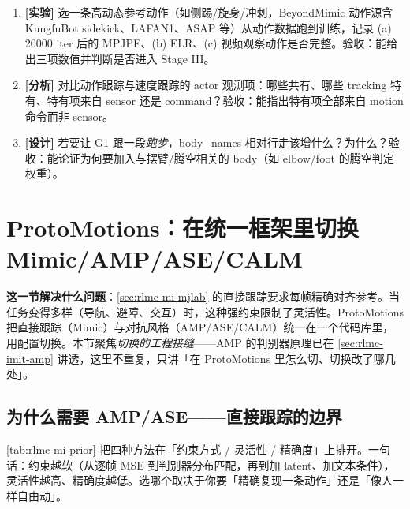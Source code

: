 \begin{practice}[本节练习]
\begin{enumerate}
  \item \textbf{[实验]} 选一条高动态参考动作（如侧踢/旋身/冲刺，BeyondMimic 动作源含 KungfuBot sidekick、LAFAN1、ASAP 等）从动作数据跑到训练，记录 (a) 20000 iter 后的 MPJPE、(b) ELR、(c) 视频观察动作是否完整。验收：能给出三项数值并判断是否进入 Stage III。
  \item \textbf{[分析]} 对比动作跟踪与速度跟踪的 actor 观测项：哪些共有、哪些 tracking 特有、特有项来自 sensor 还是 command？验收：能指出特有项全部来自 motion 命令而非 sensor。
  \item \textbf{[设计]} 若要让 G1 跟一段\emph{跑步}，body\_names 相对行走该增什么？为什么？验收：能论证为何要加入与摆臂/腾空相关的 body（如 elbow/foot 的腾空判定权重）。
\end{enumerate}
\end{practice}

\section{ProtoMotions：在统一框架里切换 Mimic/AMP/ASE/CALM}
\label{sec:rlmc-mi-proto}

\textbf{这一节解决什么问题}：\cref{sec:rlmc-mi-mjlab} 的直接跟踪要求每帧精确对齐参考。当任务变得多样（导航、避障、交互）时，这种强约束限制了灵活性。ProtoMotions 把直接跟踪（Mimic）与对抗风格（AMP/ASE/CALM）统一在一个代码库里，用配置切换。本节聚焦\emph{切换的工程接缝}——AMP 的判别器原理已在 \cref{sec:rlmc-imit-amp} 讲透，这里不重复，只讲「在 ProtoMotions 里怎么切、切换改了哪几处」。

\subsection{为什么需要 AMP/ASE——直接跟踪的边界}
\label{sec:rlmc-mi-proto-why}

\cref{tab:rlmc-mi-prior} 把四种方法在「约束方式 / 灵活性 / 精确度」上排开。一句话：约束越软（从逐帧 MSE 到判别器分布匹配，再到加 latent、加文本条件），灵活性越高、精确度越低。选哪个取决于你要「精确复现一条动作」还是「像人一样自由动」。

